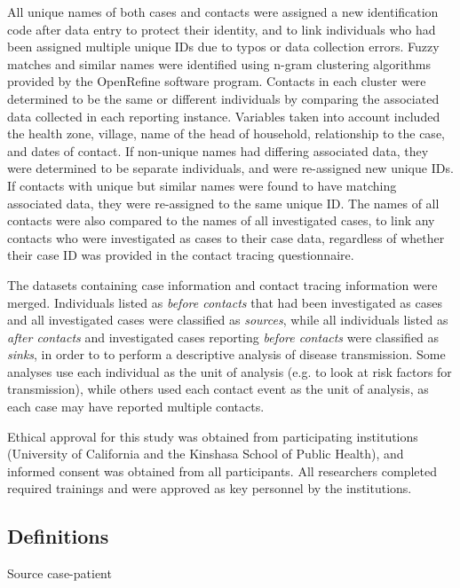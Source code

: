 All unique names of both cases and contacts were assigned a new identification code after data entry to protect their identity, and to link individuals who had been assigned multiple unique IDs due to typos or data collection errors. Fuzzy matches and similar names were identified using n-gram clustering algorithms provided by the OpenRefine software program. Contacts in each cluster were determined to be the same or different individuals by comparing the associated data collected in each reporting instance. Variables taken into account included the health zone, village, name of the head of household, relationship to the case, and dates of contact. If non-unique names had differing associated data, they were determined to be separate individuals, and were re-assigned new unique IDs. If contacts with unique but similar names were found to have matching associated data, they were re-assigned to the same unique ID. The names of all contacts were also compared to the names of all investigated cases, to link any contacts who were investigated as cases to their case data, regardless of whether their case ID was provided in the contact tracing questionnaire.

The datasets containing case information and contact tracing information were merged. Individuals listed as \textit{before contacts} that had been investigated as cases and all investigated cases were classified as \textit{sources}, while all individuals listed as \textit{after contacts} and investigated cases reporting \textit{before contacts} were classified as \textit{sinks}, in order to to perform a descriptive analysis of disease transmission. Some analyses use each individual as the unit of analysis (e.g. to look at risk factors for transmission), while others used each contact event as the unit of analysis, as each case may have reported multiple contacts. 

Ethical approval for this study was obtained from participating institutions (University of California and the Kinshasa School of Public Health), and informed consent was obtained from all participants. All researchers completed required trainings and were approved as key personnel by the institutions. 

\subsection{Definitions}
Source case-patient \cite{Dixon2015}



